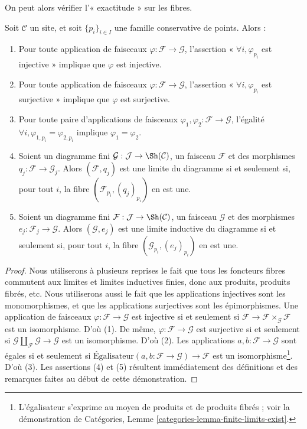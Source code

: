 \noindent
On peut alors vérifier l’« exactitude » sur les fibres.

\begin{lemma}
\label{lemma-exactness-stalks}
Soit $\mathcal{C}$ un site, et soit $\{p_i\}_{i\in I}$ une famille conservative
de points. Alors :
\begin{enumerate}
\item Pour toute application de faisceaux $\varphi : \mathcal{F} \to \mathcal{G}$,
l’assertion « $\forall i, \varphi_{p_i}$ est injective » implique que $\varphi$ est injective.
\item Pour toute application de faisceaux $\varphi : \mathcal{F} \to \mathcal{G}$,
l’assertion « $\forall i, \varphi_{p_i}$ est surjective » implique que $\varphi$ est surjective.
\item Pour toute paire d’applications de faisceaux
$\varphi_1, \varphi_2 : \mathcal{F} \to \mathcal{G}$,
l’égalité $\forall i, \varphi_{1, p_i} = \varphi_{2, p_i}$
implique $\varphi_1 = \varphi_2$.
\item Soient un diagramme fini $\mathcal{G} : \mathcal{J}
\to \Sh(\mathcal{C})$, un faisceau $\mathcal{F}$ et des morphismes
$q_j : \mathcal{F} \to \mathcal{G}_j$. Alors $(\mathcal{F}, q_j)$
est une limite du diagramme si et seulement si, pour tout $i$, la fibre
$(\mathcal{F}_{p_i}, (q_j)_{p_i})$ en est une.
\item Soient un diagramme fini $\mathcal{F} : \mathcal{J}
\to \Sh(\mathcal{C})$, un faisceau $\mathcal{G}$ et des morphismes
$e_j : \mathcal{F}_j \to \mathcal{G}$. Alors $(\mathcal{G}, e_j)$
est une limite inductive du diagramme si et seulement si, pour tout $i$, la fibre
$(\mathcal{G}_{p_i}, (e_j)_{p_i})$ en est une.
\end{enumerate}
\end{lemma}

\begin{proof}
Nous utiliserons à plusieurs reprises le fait que tous les foncteurs fibres commutent
aux limites et limites inductives finies, donc aux produits, produits fibrés,
etc. Nous utiliserons aussi le fait que les applications injectives sont les
monomorphismes, et que les applications surjectives sont les épimorphismes.
Une application de faisceaux $\varphi : \mathcal{F} \to \mathcal{G}$
est injective si et seulement si
$\mathcal{F} \to \mathcal{F} \times_\mathcal{G} \mathcal{F}$
est un isomorphisme. D’où (1).
De même, $\varphi : \mathcal{F} \to \mathcal{G}$
est surjective si et seulement si
$\mathcal{G} \amalg_\mathcal{F} \mathcal{G} \to \mathcal{G}$
est un isomorphisme. D’où (2).
Les applications $a, b : \mathcal{F} \to \mathcal{G}$
sont égales si et seulement si
$\text{Égalisateur}(a, b : \mathcal{F} \to \mathcal{G}) \to \mathcal{F}$
est un isomorphisme\footnote{L’égalisateur s’exprime
au moyen de produits et de produits fibrés ; voir la démonstration de
Catégories, Lemme \ref{categories-lemma-finite-limits-exist}.}. D’où (3).
Les assertions (4) et (5) résultent immédiatement des définitions
et des remarques faites au début de cette démonstration.
\end{proof}

